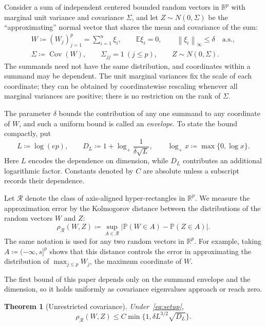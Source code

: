 \documentclass[11pt,letterpaper]{article}
\newtheorem{theorem}{Theorem}
\theoremstyle{remark}
\newcommand{\E}{\mathbb E}
\newcommand{\Pp}{\mathbb P}
\newcommand{\R}{\mathbb R}
\newcommand{\Cov}{\operatorname{Cov}}
\newcommand{\norm}[1]{\left\lVert#1\right\rVert}
\newcommand{\rh}{\rho_{\mathcal R}}
\begin{document}
Consider a sum of independent centered bounded random vectors in
\(\R^p\) with marginal unit variance and covariance \(\Sigma\), and let
\(Z\sim N(0,\Sigma)\) be the ``approximating'' normal vector that shares the
mean and covariance of the sum:
\begin{equation}
 \begin{gathered}
 W\coloneqq (W_j)_{j=1}^p=\sum_{i=1}^n\xi_i,\qquad
 \E\xi_i=0,\qquad \norm{\xi_i}_\infty\le\delta\quad\text{a.s.},\\
 \Sigma\coloneqq \Cov(W),\qquad\Sigma_{jj}=1\ (j\le p),
 \qquad Z\sim N(0,\Sigma).
 \end{gathered}
 \label{eq:setup}
\end{equation}
The summands need not have the same distribution, and coordinates within
a summand may be dependent. The unit marginal variances fix the scale
of each coordinate; they can be obtained by coordinatewise rescaling
whenever all marginal variances are positive; there is no
restriction on the rank of \(\Sigma\).

The parameter \(\delta\) bounds the contribution of any one summand
to any coordinate of \(W\), and such a uniform bound is called an
\emph{envelope}. To state the
bound compactly, put
\[
 L\coloneqq \log(ep),\qquad
 D_L\coloneqq 1+\log_+\frac1{\delta\sqrt L},\qquad
 \log_+x\coloneqq \max\{0,\log x\}.
\]
Here \(L\) encodes the dependence on dimension, while \(D_L\)
contributes an additional logarithmic factor. Constants denoted by
\(C\) are absolute unless a subscript records their dependence.

\indent
Let \(\mathcal R\) denote the class of axis-aligned hyper-rectangles in
\(\R^p\). We measure the approximation error by the Kolmogorov distance
between the distributions of the random vectors \(W\) and \(Z\):
\[
 \rh(W,Z)\coloneqq \sup_{A\in\mathcal R}
       |\Pp(W\in A)-\Pp(Z\in A)|.
\]
The same notation is used for any two random vectors in \(\R^p\). For
example, taking \(A\coloneqq (-\infty,s]^p\) shows that this distance controls the
error in approximating the distribution of \(\max_{j\le p}W_j\), the maximum
coordinate of \(W\).

The first bound of this paper depends only on the summand envelope and the
dimension, so it holds uniformly as covariance eigenvalues approach or
reach zero.

\begin{theorem}[Unrestricted covariance]\label{thm:unrestricted}
Under~\eqref{eq:setup},
\begin{equation}
 \rh(W,Z)\le C\min\{1,\delta L^{3/2}\sqrt{D_L}\}.
 \label{eq:unrestricted}
\end{equation}
\end{theorem}
\end{document}
